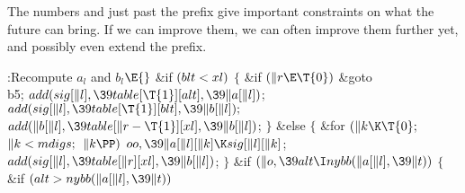 The numbers  and  just past the
prefix give important constraints
on what the future can bring. If we can improve them, we can often
improve them further yet, and possibly even extend the prefix.

\Y\B\4:Recompute $a_l$ and $b_l$\X${}\E{}$\6
\&{if} ${}(\\{blt}<\\{xl}){}$\5
${}\{{}$\1\6
\&{if} ${}(\|r\E\T{0}){}$\1\5
\&{goto} \\{b5};\2\6
${}\\{add}(\\{sig}[\|l],\39\\{table}[\T{1}][\\{alt}],\39\|a[\|l]){}$;\6
${}\\{add}(\\{sig}[\|l],\39\\{table}[\T{1}][\\{blt}],\39\|b[\|l]);{}$\6
${}\\{add}(\|b[\|l],\39\\{table}[\|r-\T{1}][\\{xl}],\39\|b[\|l]){}$;\6
\4${}\}{}$\5
\2\&{else}\5
${}\{{}$\1\6
\&{for} ${}(\|k\K\T{0};{}$ ${}\|k<\\{mdigs};{}$ ${}\|k\PP){}$\1\5
${}\\{oo},\39\|a[\|l][\|k]\K\\{sig}[\|l][\|k]{}$;\2\6
${}\\{add}(\\{sig}[\|l],\39\\{table}[\|r][\\{xl}],\39\|b[\|l]){}$;\6
\4${}\}{}$\2\6
\&{if} ${}(\|o,\39\\{alt}\I\\{nybb}(\|a[\|l],\39\|t)){}$\5
${}\{{}$\1\6
\&{if} ${}(\\{alt}>\\{nybb}(\|a[\|l],\39\|t)){}$\5
